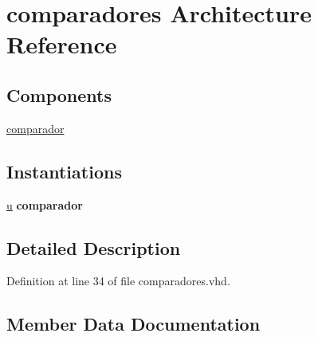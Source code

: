 \hypertarget{classcomparadores_1_1comparadores}{}\section{comparadores Architecture Reference}
\label{classcomparadores_1_1comparadores}
\subsection*{Components}
 \begin{DoxyCompactItemize}
\item 
\hyperlink{classcomparadores_1_1comparadores_ace6ea24c011c9df8c51cbea5a509a663}{comparador}  {\bfseries }  
\end{DoxyCompactItemize}
\subsection*{Instantiations}
 \begin{DoxyCompactItemize}
\item 
\hyperlink{classcomparadores_1_1comparadores_a6277e2a7446059985dc9bcf0a4ac1a8f}{u}  {\bfseries comparador}   
\end{DoxyCompactItemize}


\subsection{Detailed Description}


Definition at line 34 of file comparadores.\+vhd.



\subsection{Member Data Documentation}
\hypertarget{classcomparadores_1_1comparadores_ace6ea24c011c9df8c51cbea5a509a663}{}
\subsubsection[{comparador}]{ {\bfseries \textcolor{vhdlchar}{ }} \hspace{0.3cm}{\ttfamily [Component]}}\label{classcomparadores_1_1comparadores_ace6ea24c011c9df8c51cbea5a509a663}


